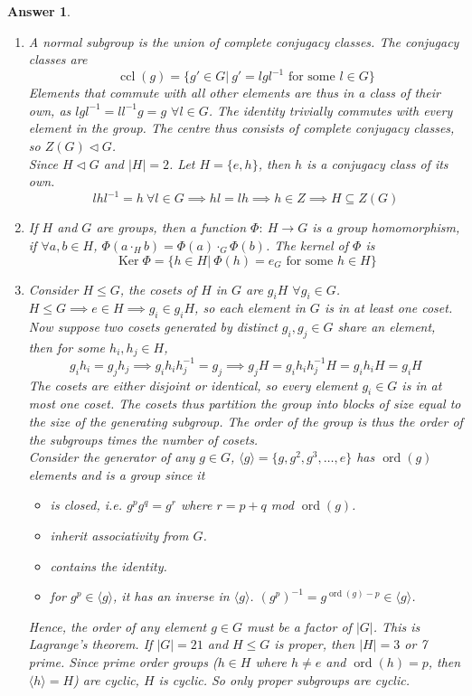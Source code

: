 \documentclass[a4paper]{article}
\DeclareMathOperator{\ord}{ord}
\DeclareMathOperator{\ccl}{ccl}
\DeclareMathOperator{\Ker}{Ker}
\newtheorem{ans}{Answer}[section]
\theoremstyle{new}
\begin{document}
\begin{ans}\leavevmode
\begin{enumerate}[label=(\alph*)]
\item A normal subgroup is the union of complete conjugacy classes. The conjugacy classes are
$$\ccl(g)=\{g'\in G|~g'=lgl^{-1}\text{ for some }l\in G\}$$
Elements that commute with all other elements are thus in a class of their own, as $lgl^{-1}=ll^{-1}g=g$ $\forall l\in G$. The identity trivially commutes with every element in the group. The  centre thus consists of complete conjugacy classes, so $Z(G)\lhd G$.\\[5pt]
Since $H\lhd G$ and $|H|=2$. Let $H=\{e,h\}$, then $h$ is a conjugacy class of its own. 
$$lhl^{-1}=h~\forall l\in G\implies hl=lh\implies h\in Z\implies H\subseteq Z(G)$$
\item If $H$ and $G$ are groups, then a function $\Phi:~H\rightarrow G$ is a group homomorphism, if $\forall a,b\in H$, $\Phi(a\cdot_Hb)=\Phi(a)\cdot_G\Phi(b)$. The kernel of $\Phi$ is
$$\Ker\Phi=\{h\in H|~\Phi(h)=e_G\text{ for some }h\in H\}$$
\item Consider $H\leq G$, the cosets of $H$ in $G$ are $g_iH$ $\forall g_i\in G$. $H\leq G\implies e\in H\implies g_i\in g_iH$, so each element in $G$ is in at least one coset. Now suppose two cosets generated by distinct $g_i,g_j\in G$ share an element, then for some $h_i,h_j\in H$,
$$g_ih_i=g_jh_j\implies g_ih_ih_j^{-1}=g_j\implies g_jH=g_ih_ih_j^{-1}H=g_ih_iH=g_iH$$
The cosets are either disjoint or identical, so every element $g_i\in G$ is in at most one coset. The cosets thus partition the group into blocks of size equal to the size of the generating subgroup. The order of the group is thus the order of the subgroups times the number of cosets.\\[5pt]
Consider the generator of any $g\in G$, $\langle g\rangle=\{g,g^2,g^3,\dots,e\}$ has $\ord(g)$ elements and is a group since it
\begin{itemize}
    \item is closed, i.e. $g^pg^q=g^{r}$ where $r=p+q$ mod $\ord(g)$.
    \item inherit associativity from $G$.
    \item contains the identity.
    \item for $g^p\in\langle g\rangle$, it has an inverse in $\langle g\rangle$. $(g^p)^{-1}=g^{\ord(g)-p}\in\langle g\rangle$.
\end{itemize}
Hence, the order of any element $g\in G$ must be a factor of $|G|$. This is Lagrange's theorem. If $|G|=21$ and $H\leq G$ is proper, then $|H|=3$ or 7 prime. Since prime order groups ($h\in H$ where $h\neq e$ and $\ord(h)=p$, then $\langle h\rangle=H$) are cyclic, $H$ is cyclic. So only proper subgroups are cyclic.
\end{enumerate}
\end{ans}
\end{document}
